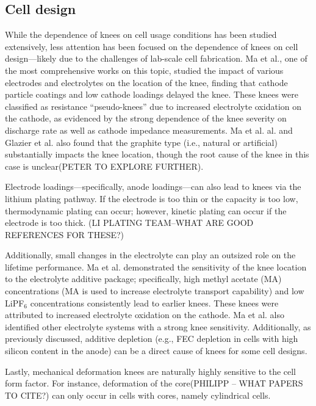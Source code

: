 \documentclass[journal=jpcl, manuscript=article, layout=onecolumn]{achemso}
\begin{document}
\subsection{Cell design}

While the dependence of knees on cell usage conditions has been studied extensively, less attention has been focused on the dependence of knees on cell design---likely due to the challenges of lab-scale cell fabrication. Ma et al.\cite{ma_editors_2019}, one of the most comprehensive works on this topic, studied the impact of various electrodes and electrolytes on the location of the knee, finding that cathode particle coatings and low cathode loadings delayed the knee. These knees were classified as resistance ``pseudo-knees'' due to increased electrolyte oxidation on the cathode, as evidenced by the strong dependence of the knee severity on discharge rate as well as cathode impedance measurements. Ma et al. al.\cite{ma_editors_2019} and Glazier et al.\cite{glazier_analysis_2017} also found that the graphite type (i.e., natural or artificial) substantially impacts the knee location, though the root cause of the knee in this case is unclear(PETER TO EXPLORE FURTHER).

Electrode loadings---specifically, anode loadings---can also lead to knees via the lithium plating pathway.
If the electrode is too thin or the capacity is too low, thermodynamic plating can occur; however, kinetic plating can occur if the electrode is too thick. (LI PLATING TEAM--WHAT ARE GOOD REFERENCES FOR THESE?)

Additionally, small changes in the electrolyte can play an outsized role on the lifetime performance. Ma et al.\cite{ma_editors_2019} demonstrated the sensitivity of the knee location to the electrolyte additive package; specifically, high methyl acetate (MA) concentrations (MA is used to increase electrolyte transport capability) and low LiPF$_6$ concentrations consistently lead to earlier knees. These knees were attributed to increased electrolyte oxidation on the cathode. Ma et al.\cite{ma_editors_2019} also identified other electrolyte systems with a strong knee sensitivity. Additionally, as previously discussed, additive depletion (e.g., FEC depletion in cells with high silicon content in the anode) can be a direct cause of knees for some cell designs.

Lastly, mechanical deformation knees are naturally highly sensitive to the cell form factor. For instance, deformation of the core(PHILIPP -- WHAT PAPERS TO CITE?) can only occur in cells with cores, namely cylindrical cells.
\end{document}
